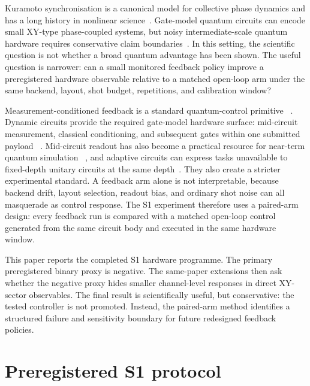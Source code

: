 \documentclass[preprint,aps,physrev,superscriptaddress,floatfix,longbibliography]{revtex4-2}
\begin{document}
Kuramoto synchronisation is a canonical model for collective phase dynamics
and has a long history in nonlinear science~\cite{Kuramoto1975,Acebron2005}.
Gate-model quantum circuits can encode small XY-type phase-coupled systems,
but noisy intermediate-scale quantum hardware requires conservative claim
boundaries~\cite{Preskill2018,NielsenChuang2010}. In this setting, the
scientific question is not whether a broad quantum advantage has been shown.
The useful question is narrower: can a small monitored feedback policy improve
a preregistered hardware observable relative to a matched open-loop arm under
the same backend, layout, shot budget, repetitions, and calibration window?

Measurement-conditioned feedback is a standard quantum-control primitive
~\cite{WisemanMilburn2010}. Dynamic circuits provide the required gate-model
hardware surface: mid-circuit measurement, classical conditioning, and
subsequent gates within one submitted payload
~\cite{Corcoles2021,IBMQuantum,Qiskit2024}. Mid-circuit readout has also
become a practical resource for near-term quantum simulation
~\cite{Koh2023}, and adaptive circuits can express tasks unavailable to
fixed-depth unitary circuits at the same depth~\cite{FossFeig2023}. They also
create a stricter experimental standard. A feedback arm alone is not
interpretable, because backend drift, layout selection, readout bias, and
ordinary shot noise can all masquerade as control response. The S1 experiment
therefore uses a paired-arm design: every feedback run is compared with a
matched open-loop control generated from the same circuit body and executed in
the same hardware window.

This paper reports the completed S1 hardware programme. The primary
preregistered binary proxy is negative. The same-paper extensions then ask
whether the negative proxy hides smaller channel-level responses in direct
XY-sector observables. The final result is scientifically useful, but
conservative: the tested controller is not promoted. Instead, the paired-arm
method identifies a structured failure and sensitivity boundary for future
redesigned feedback policies.

\section{Preregistered S1 protocol}
\end{document}
